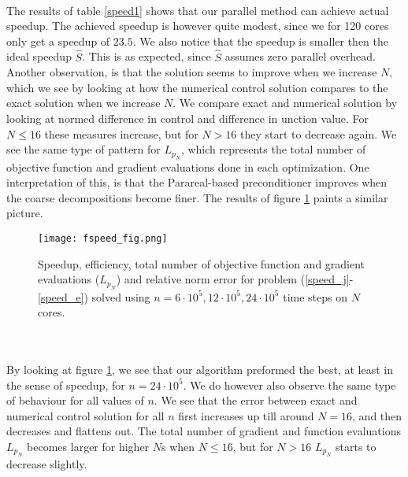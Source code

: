 \noindent
\\
The results of table \ref{speed1} shows that our parallel method can achieve actual speedup. The achieved speedup is however quite modest, since we for 120 cores only get a speedup of $23.5$. We also notice that the speedup is smaller then the ideal speedup $\hat S$. This is as expected, since $\hat S$ assumes zero parallel overhead. Another observation, is that the solution seems to improve when we increase $N$, which we see by looking at how the numerical control solution compares to the exact solution when we increase $N$. We compare exact and numerical solution by looking at normed difference in control and difference in unction value. For $N\leq16$ these measures increase, but for $N>16$ they start to decrease again. We see the same type of pattern for $L_{p_N}$, which represents the total number of objective function and gradient evaluations done in each optimization. One interpretation of this, is that the Parareal-based preconditioner improves when the coarse decompositions become finer. The results of figure \ref{speed_fig1} paints a similar picture.
\begin{figure}[!h]
\centering
\texttt{[image: fspeed\_fig.png]}
\centering
\caption{Speedup, efficiency, total number of objective function and gradient evaluations  ($L_{p_N}$) and relative norm error for problem (\ref{speed_j}-\ref{speed_e}) solved using $n=6\cdot 10^5,12\cdot 10^5,24\cdot 10^5$ time steps on $N$ cores.}
\label{speed_fig1}
\end{figure}
\\
\\
By looking at figure \ref{speed_fig1}, we see that our algorithm preformed the best, at least in the sense of speedup, for $n=24\cdot 10^5$. We do however also observe the same type of behaviour for all values of $n$. We see that the error between exact and numerical control solution for all $n$ first increases up till around $N=16$, and then decreases and flattens out. The total number of gradient and function evaluations $L_{p_N}$ becomes larger for higher $N$s when $N\leq 16$, but for $N>16$ $L_{p_N}$ starts to decrease slightly.  